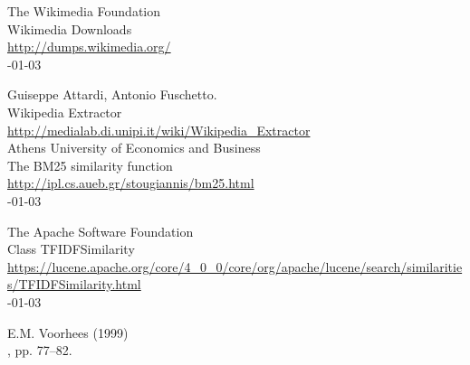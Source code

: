\documentclass[11pt,letterpaper]{article}
\begin{document}
\begin{thebibliography}{}
The Wikimedia Foundation \\
\newblock Wikimedia Downloads \\
\newblock \url{http://dumps.wikimedia.org/} \\
-01-03

Guiseppe Attardi, Antonio Fuschetto. \\
\newblock Wikipedia Extractor \\
\newblock \url{http://medialab.di.unipi.it/wiki/Wikipedia_Extractor} \\

Athens University of Economics and Business \\
\newblock The BM25 similarity function \\
\newblock \url{http://ipl.cs.aueb.gr/stougiannis/bm25.html} \\
-01-03

The Apache Software Foundation \\
\newblock Class TFIDFSimilarity \\
\newblock \url{https://lucene.apache.org/core/4_0_0/core/org/apache/lucene/search/similarities/TFIDFSimilarity.html} \\
-01-03

E.M. Voorhees (1999) \\
, pp. 77--82.


\end{thebibliography}
\end{document}
